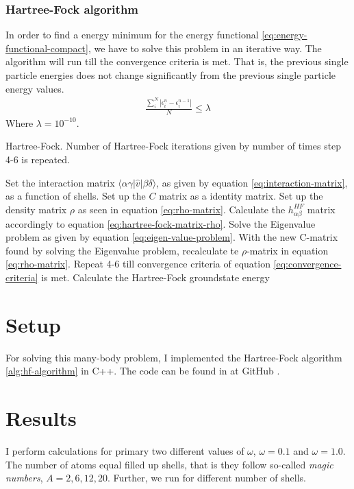 \documentclass[11pt]{article}
\newcommand{\husk}[1]{\color{red} #1 \color{black}}
\begin{document}
\subsubsection{Hartree-Fock algorithm}
In order to find a energy minimum for the energy functional \eqref{eq:energy-functional-compact}, we have to solve this problem in an iterative way. The algorithm will run till the convergence criteria is met. That is, the previous single particle energies does not change significantly from the previous single particle energy values.
\begin{align}
	\frac{\sum_i^N|\epsilon^{n}_i - \epsilon^{n-1}_i|}{N} \leq \lambda
	\label{eq:convergence-criteria}
\end{align}
Where $\lambda=10^{-10}$.

\begin{algorithm}[H]
\caption{Hartree-Fock. Number of Hartree-Fock iterations given by number of times step 4-6 is repeated.}
\label{alg:hf-algorithm}
\begin{algorithmic}[1]
\State Set the interaction matrix $\langle \alpha \gamma |\hat{v}| \beta \delta \rangle$, as given by equation \eqref{eq:interaction-matrix}, as a function of shells.
\State Set up the $C$ matrix as a identity matrix.
\State Set up the density matrix $\rho$ as seen in equation \eqref{eq:rho-matrix}.
\State Calculate the $h^{HF}_{\alpha\beta}$ matrix accordingly to equation \eqref{eq:hartree-fock-matrix-rho}.
\State Solve the Eigenvalue problem as given by equation \eqref{eq:eigen-value-problem}.
\State With the new C-matrix found by solving the Eigenvalue problem, recalculate te $\rho$-matrix in equation \eqref{eq:rho-matrix}.
\State Repeat 4-6 till convergence criteria of equation \eqref{eq:convergence-criteria} is met.
\State Calculate the Hartree-Fock groundstate energy
\end{algorithmic}
\end{algorithm}

\section{Setup}
For solving this many-body problem, I implemented the Hartree-Fock algorithm \ref{alg:hf-algorithm} in C++. The code can be found in at \husk{GitHub}.

\section{Results}
I perform calculations for primary two different values of $\omega$, $\omega=0.1$ and $\omega=1.0$. The number of atoms equal filled up shells, that is they follow so-called \textit{magic numbers}, $A = 2, 6, 12, 20$. Further, we run for different number of shells.
\end{document}
